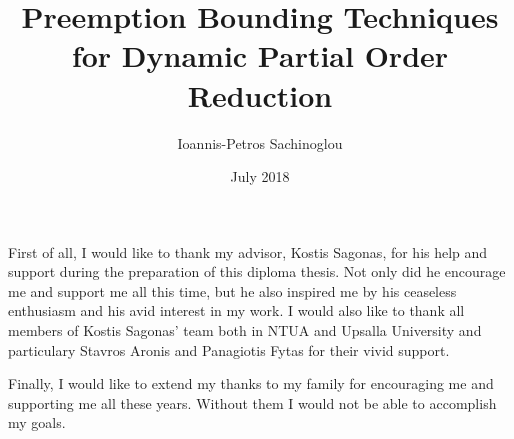 \documentclass[diploma, english]{softlab-thesis}
\theoremstyle{definition}
\begin{document}

\frontmatter

\title{Preemption Bounding Techniques for Dynamic Partial Order Reduction}
\author{Ioannis-Petros Sachinoglou}
\date{July 2018}




\maketitle



\iffalse
\begin{abstractgr}%
  

  
\begin{keywordsgr}

\end{keywordsgr}
\end{abstractgr}
\fi

\begin{abstracten}%
  

  
\begin{keywordsen}

\end{keywordsen}
\end{abstracten}


\iffalse
\begin{acknowledgementsgr}
\end{acknowledgementsgr}
\fi

\begin{acknowledgementsen}

  First of all, I would like to thank my advisor, Kostis Sagonas, for his help and support during the preparation of
  this diploma thesis. Not only did he encourage me and support me all this time, but he also inspired me by his
  ceaseless enthusiasm and his avid interest in my work. I would also like to thank all members of Kostis Sagonas' team
  both in NTUA and Upsalla University and particulary Stavros Aronis and Panagiotis Fytas for their vivid support. 

  Finally, I would like to extend my thanks to my family for encouraging me and supporting me all these years. Without them I would not
  be able to accomplish my goals.
  
\end{acknowledgementsen}
\end{document}
